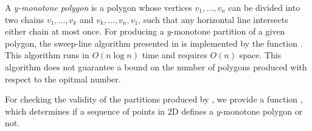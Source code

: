 A {\em $y$-monotone polygon}
is a polygon whose vertices $v_1, \ldots, v_n$ can be divided into two chains 
$v_1, \ldots, v_k$ and $v_k, \ldots, v_n, v_1$, such that any horizontal line 
intersects either chain at most once.  For producing a $y$-monotone partition 
of a given polygon, the sweep-line algorithm 
presented in \cite{bkos-cgaa-97} is implemented by the function
.  
This algorithm runs in $O(n \log n)$ time and requires $O(n)$ space.
This algorithm does not guarantee a bound on the number of polygons 
produced with respect to the opitmal number.

For checking the validity of the partitions produced by 
, we provide a function , 
which determines if a sequence of points in 2D defines a $y$-monotone
polygon or not.

